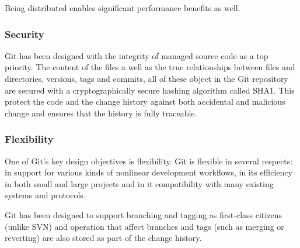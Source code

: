 \documentclass[11pt]{article}
\begin{document}
Being distributed enables significant performance benefits as well.

\subsubsection{Security}
\label{sec:org101acd0}
Git has been designed with the integrity of managed source code as a top priority. The content of the files a well as the true relationships between files and directories, versions, tags and commits, all of these object in the Git repository are secured with a cryptographically secure hashing algorithm called SHA1. This protect the code and the change history against both accidental and malicious change and ensures that the history is fully traceable.

\subsubsection{Flexibility}
\label{sec:org872d22b}
One of Git's key design objectives is flexibility. Git is flexible in several respects: in support for various kinds of nonlinear development workflows, in its efficiency in both small and large projects and in it compatibility with many existing systems and protocols.

Git has been designed to support branching and tagging as first-class citizens (unlike SVN) and operation that affect branches and tags (such as merging or reverting) are also stored as part of the change history.
\end{document}
